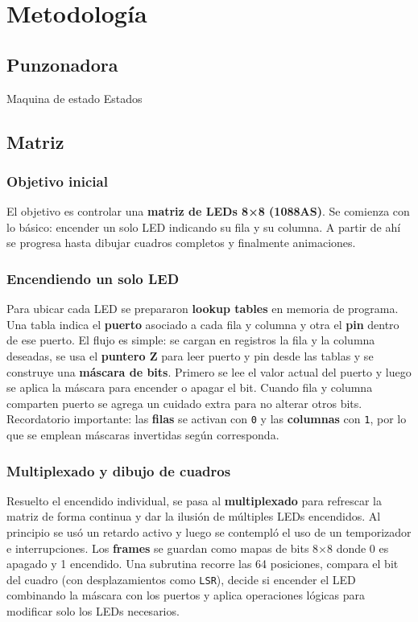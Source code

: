 \section{Metodología}
\subsection{Punzonadora}
Maquina de estado
Estados


\subsection{Matriz}

\subsubsection{Objetivo inicial}
El objetivo es controlar una \textbf{matriz de LEDs 8×8 (1088AS)}. Se comienza con lo básico: encender un solo LED indicando su fila y su columna. A partir de ahí se progresa hasta dibujar cuadros completos y finalmente animaciones.

\subsubsection{Encendiendo un solo LED}
Para ubicar cada LED se prepararon \textbf{lookup tables} en memoria de programa. Una tabla indica el \textbf{puerto} asociado a cada fila y columna y otra el \textbf{pin} dentro de ese puerto. El flujo es simple: se cargan en registros la fila y la columna deseadas, se usa el \textbf{puntero Z} para leer puerto y pin desde las tablas y se construye una \textbf{máscara de bits}. Primero se lee el valor actual del puerto y luego se aplica la máscara para encender o apagar el bit. Cuando fila y columna comparten puerto se agrega un cuidado extra para no alterar otros bits. Recordatorio importante: las \textbf{filas} se activan con \texttt{0} y las \textbf{columnas} con \texttt{1}, por lo que se emplean máscaras invertidas según corresponda.

\subsubsection{Multiplexado y dibujo de cuadros}
Resuelto el encendido individual, se pasa al \textbf{multiplexado} para refrescar la matriz de forma continua y dar la ilusión de múltiples LEDs encendidos. Al principio se usó un retardo activo y luego se contempló el uso de un temporizador e interrupciones. Los \textbf{frames} se guardan como mapas de bits 8×8 donde 0 es apagado y 1 encendido. Una subrutina recorre las 64 posiciones, compara el bit del cuadro (con desplazamientos como \texttt{LSR}), decide si encender el LED combinando la máscara con los puertos y aplica operaciones lógicas para modificar solo los LEDs necesarios.

